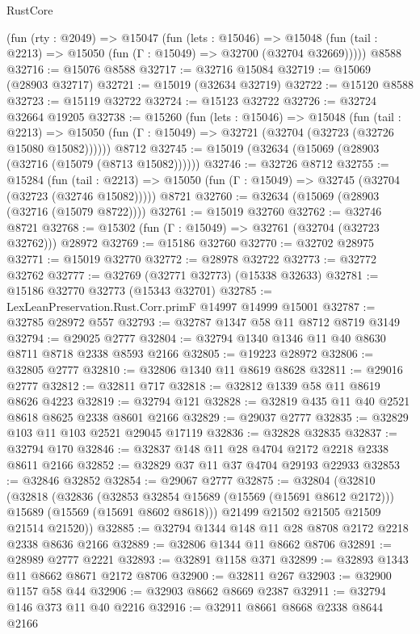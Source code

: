 \begin{lexlean}{RustCore}
\begin{coremodule}
    (fun (rty : @2049) =>
    @15047
      (fun (lets : @15046) =>
      @15048 (fun (tail : @2213) => @15050 (fun (Γ : @15049) => @32700 (@32704 @32669)))))
    @8588
@32716 := @15076 @8588
@32717 := @32716 @15084
@32719 := @15069 (@28903 @32717)
@32721 := @15019 (@32634 @32719)
@32722 := @15120 @8588
@32723 := @15119 @32722
@32724 := @15123 @32722
@32726 := @32724 @32664 @19205
@32738 := @15260
    (fun (lets : @15046) =>
    @15048
      (fun (tail : @2213) =>
      @15050 (fun (Γ : @15049) => @32721 (@32704 (@32723 (@32726 @15080 @15082))))))
    @8712
@32745 := @15019 (@32634 (@15069 (@28903 (@32716 (@15079 (@8713 @15082))))))
@32746 := @32726 @8712
@32755 := @15284
    (fun (tail : @2213) => @15050 (fun (Γ : @15049) => @32745 (@32704 (@32723 (@32746 @15082)))))
    @8721
@32760 := @32634 (@15069 (@28903 (@32716 (@15079 @8722))))
@32761 := @15019 @32760
@32762 := @32746 @8721
@32768 := @15302 (fun (Γ : @15049) => @32761 (@32704 (@32723 @32762))) @28972
@32769 := @15186 @32760
@32770 := @32702 @28975
@32771 := @15019 @32770
@32772 := @28978 @32722
@32773 := @32772 @32762
@32777 := @32769 (@32771 @32773) (@15338 @32633)
@32781 := @15186 @32770 @32773 (@15343 @32701)
@32785 := LexLeanPreservation.Rust.Corr.primF @14997 @14999 @15001
@32787 := @32785 @28972 @557
@32793 := @32787 @1347 @58 @11 @8712 @8719 @3149
@32794 := @29025 @2777
@32804 := @32794 @1340 @1346 @11 @40 @8630 @8711 @8718 @2338 @8593 @2166
@32805 := @19223 @28972
@32806 := @32805 @2777
@32810 := @32806 @1340 @11 @8619 @8628
@32811 := @29016 @2777
@32812 := @32811 @717
@32818 := @32812 @1339 @58 @11 @8619 @8626 @4223
@32819 := @32794 @121
@32828 := @32819 @435 @11 @40 @2521 @8618 @8625 @2338 @8601 @2166
@32829 := @29037 @2777
@32835 := @32829 @103 @11 @103 @2521 @29045 @17119
@32836 := @32828 @32835
@32837 := @32794 @170
@32846 := @32837 @148 @11 @28 @4704 @2172 @2218 @2338 @8611 @2166
@32852 := @32829 @37 @11 @37 @4704 @29193 @22933
@32853 := @32846 @32852
@32854 := @29067 @2777
@32875 := @32804
    (@32810
      (@32818
        (@32836
          (@32853 @32854 @15689 (@15569 (@15691 @8612 @2172)))
          @15689
          (@15569 (@15691 @8602 @8618)))
        @21499
        @21502
        @21505
        @21509
        @21514
        @21520))
@32885 := @32794 @1344 @148 @11 @28 @8708 @2172 @2218 @2338 @8636 @2166
@32889 := @32806 @1344 @11 @8662 @8706
@32891 := @28989 @2777 @2221
@32893 := @32891 @1158 @371
@32899 := @32893 @1343 @11 @8662 @8671 @2172 @8706
@32900 := @32811 @267
@32903 := @32900 @1157 @58 @44
@32906 := @32903 @8662 @8669 @2387
@32911 := @32794 @146 @373 @11 @40 @2216
@32916 := @32911 @8661 @8668 @2338 @8644 @2166

\end{coremodule}
\end{lexlean}
